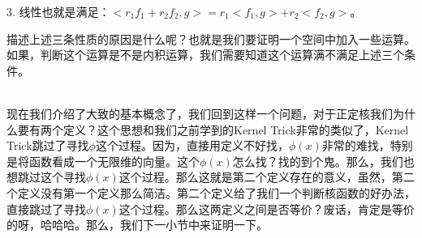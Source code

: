 \documentclass[a4paper]{article}
\begin{document}
3. 线性也就是满足：$<r_1f_1+r_2f_2, g> = r_1<f_1,g>+r_2<f_2,g>$。

描述上述三条性质的原因是什么呢？也就是我们要证明一个空间中加入一些运算。如果，判断这个运算是不是内积运算，我们需要知道这个运算满不满足上述三个条件。

~\\

现在我们介绍了大致的基本概念了，我们回到这样一个问题，对于正定核我们为什么要有两个定义？这个思想和我们之前学到的Kernel Trick非常的类似了，Kernel Trick跳过了寻找$\phi$这个过程。因为，直接用定义不好找，$
\phi(x)$非常的难找，特别是将函数看成一个无限维的向量。这个$\phi(x)$怎么找？找的到个鬼。那么，我们也想跳过这个寻找$\phi(x)$这个过程。那么这就是第二个定义存在的意义，虽然，第二个定义没有第一个定义那么简洁。第二个定义给了我们一个判断核函数的好办法，直接跳过了寻找$\phi(x)$这个过程。那么这两定义之间是否等价？废话，肯定是等价的呀，哈哈哈。那么，我们下一小节中来证明一下。
\end{document}
